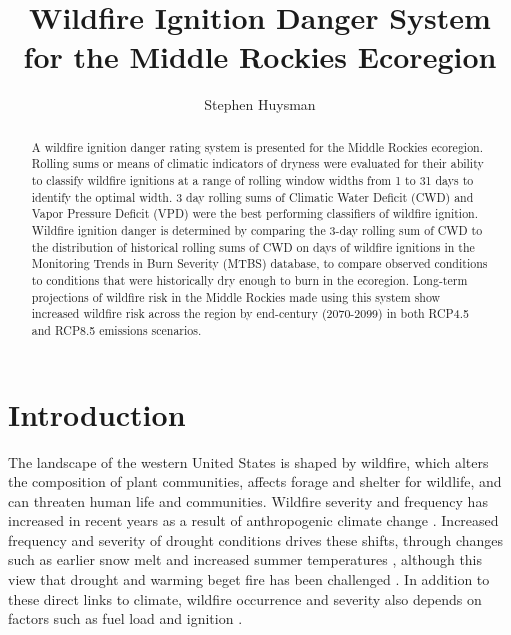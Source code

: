 \documentclass[11pt]{article}
\author{Stephen Huysman}
\title{Wildfire Ignition Danger System for the Middle Rockies Ecoregion}
\begin{document}
\maketitle


\begin{abstract}
A wildfire ignition danger rating system is presented for the Middle Rockies ecoregion. Rolling sums or means of climatic indicators of dryness were evaluated for their ability to classify wildfire ignitions at a range of rolling window widths from 1 to 31 days to identify the optimal width.  3 day rolling sums of Climatic Water Deficit (CWD) and Vapor Pressure Deficit (VPD) were the best performing classifiers of wildfire ignition. Wildfire ignition danger is determined by comparing the 3-day rolling sum of CWD to the distribution of historical rolling sums of CWD on days of wildfire ignitions in the Monitoring Trends in Burn Severity (MTBS) database, to compare observed conditions to conditions that were historically dry enough to burn in the ecoregion. Long-term projections of wildfire risk in the Middle Rockies made using this system show increased wildfire risk across the region by end-century (2070-2099) in both RCP4.5 and RCP8.5 emissions scenarios.
  
\end{abstract}

\section{Introduction}

The landscape of the western United States is shaped by wildfire, which alters the composition of plant communities, affects forage and shelter for wildlife, and can threaten human life and communities.  Wildfire severity and frequency has increased in recent years as a result of anthropogenic climate change \citep{abatzoglouImpactAnthropogenicClimate2016}.  Increased frequency and severity of drought conditions drives these shifts, through changes such as earlier snow melt \citep{tercekForecasts21stCentury2016} and increased summer temperatures \citep{runningGlobalWarmingCausing2006}, although this view that drought and warming beget fire has been challenged \citep{littellClimateChangeFuture2018}.  In addition to these direct links to climate, wildfire occurrence and severity also depends on factors such as fuel load and ignition \citep{mckenzieClimateChangeEcohydrology2017}.
\end{document}
